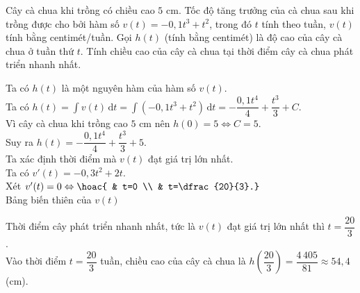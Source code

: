 \begin{bt}%

Cây cà chua khi trồng có chiều cao $5$ cm. Tốc độ tăng trưởng của cà chua sau khi trồng được cho bởi hàm số $v(t)=-0{,}1t^3+t^2$, trong đó $t$ tính theo tuần, $v(t)$ tính bằng centimét/tuần. Gọi $h(t)$ (tính bằng centimét) là độ cao của cây cà chua ở tuần thứ $t$. Tính chiều cao của cây cà chua tại thời điểm cây cà chua phát triển nhanh nhất.
\loigiai
{
Ta có $h(t)$ là một nguyên hàm của hàm số $v(t)$. \\
Ta có $h(t)=\displaystyle\int v(t)\mathrm{\,d}t=\displaystyle\int \left(-0{,}1t^3+t^2\right)\mathrm{\,d}t=-\dfrac{0{,}1t^4}{4}+\dfrac{t^3}{3}+C$. \\
Vì cây cà chua khi trồng cao $5$ cm nên $h(0)=5 \Leftrightarrow C=5$.\\
Suy ra $h(t)=-\dfrac{0{,}1t^4}{4}+\dfrac{t^3}{3}+5$. \\
Ta xác định thời điểm mà $v(t)$ đạt giá trị lớn nhất. \\
Ta có $v'(t)=-0{,}3t^2+2t$. \\
Xét $v'(t)=0 \Leftrightarrow \hoac{ & t=0 \\ & t=\dfrac{20}{3}.}$ \\
Bảng biến thiên của $v(t)$
\begin{center}
\end{center}
Thời điểm cây phát triển nhanh nhất, tức là $v(t)$ đạt giá trị lớn nhất thì $t=\dfrac{20}{3}$.\\
Vào thời điểm $t=\dfrac{20}{3}$ tuần, chiều cao của cây cà chua là $h\left(\dfrac{20}{3}\right)=\dfrac{4\,405}{81}\approx54{,}4$ (cm).
}
\end{bt}

